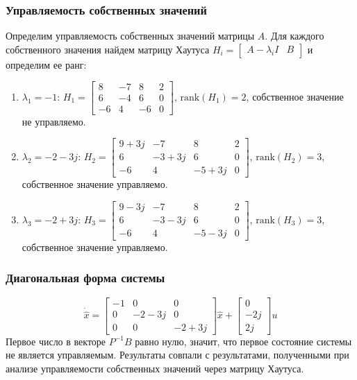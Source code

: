 \subsubsection{Управляемость собственных значений}
Определим управляемость собственных значений матрицы $A$. Для каждого собственного значения найдем матрицу Хаутуса $H_i = \begin{bmatrix} A - \lambda_i I & B \end{bmatrix}$ и определим ее ранг:
\begin{enumerate}
    \item $\lambda_1 = -1$: $H_1 = \begin{bmatrix}
        8 & -7 & 8 & 2\\
        6 & -4 & 6 & 0 \\
        -6 & 4 & -6 & 0
    \end{bmatrix}$, $\text{rank}(H_1) = 2$, собственное значение не управляемо.
    \item $\lambda_2 = -2-3j$: $H_2 = \begin{bmatrix}
        9+3j & -7 & 8 & 2\\
        6 & -3+3j & 6 & 0 \\
        -6 & 4 & -5+3j & 0
    \end{bmatrix}$, $\text{rank}(H_2) = 3$, собственное значение управляемо.
    \item $\lambda_3 = -2+3j$: $H_3 = \begin{bmatrix}
        9-3j & -7 & 8 & 2\\
        6 & -3-3j & 6 & 0 \\
        -6 & 4 & -5-3j & 0
    \end{bmatrix}$, $\text{rank}(H_3) = 3$, собственное значение управляемо.
\end{enumerate}

\subsubsection{Диагональная форма системы}
\begin{equation}
    \dot{\hat{x}} = \begin{bmatrix}
        -1 & 0 & 0 \\
        0 & -2-3j & 0 \\
        0 & 0 & -2+3j
    \end{bmatrix} \hat{x} + 
    \begin{bmatrix}
        0 \\
        -2j \\ 
        2j
    \end{bmatrix} u
\end{equation}
Первое число в векторе $P^{-1}B$ равно нулю, значит, что первое состояние системы не является управляемым. 
Результаты совпали с результатами, полученными при анализе управляемости собственных значений через матрицу Хаутуса.

